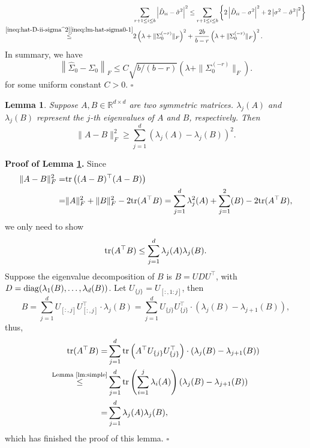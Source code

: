 \documentclass[11pt]{article}
\newtheorem{Lemma}{Lemma}
\newcommand{\0}{{\mathbf{0}}}
\newcommand{\1}{{\mathbf{1}}}
\newcommand{\tr}{{\rm tr}}
\newcommand{\diag}{{\rm diag}}
\begin{document}
\begin{equation*}
\begin{split}
& \sum_{r+1\leq i \leq b}\left|\hat{D}_{ii} - \hat{\sigma}^2\right|^2 \leq \sum_{r+1\leq i \leq b} \left\{2\left|\hat{D}_{ii} - \sigma^2\right|^2 + 2\left|\sigma^2 - \hat{\sigma}^2\right|^2\right\}\\
\overset{\eqref{ineq:hat-D-ii-sigma^2}\eqref{ineq:lm-hat-sigma0-1}}{\leq} & 2\left(\lambda+ \|\Sigma_0^{(-r)}\|_F\right)^2 + \frac{2b}{b-r}\left(\lambda + \|\Sigma_0^{(-r)}\|_F\right)^2.
\end{split}
\end{equation*}
In summary, we have
$$\left\|\hat{\Sigma}_0 - \Sigma_0\right\|_F \leq C\sqrt{b/(b-r)}\left(\lambda+\|\Sigma_0^{(-r)}\|_F\right).$$
for some uniform constant $C>0$.
\quad $\square$

\begin{Lemma}\label{lm:A-B}
	Suppose $A, B\in \mathbb{R}^{d\times d}$ are two symmetric matrices. $\lambda_j(A)$ and $\lambda_j(B)$ represent the $j$-th eigenvalues of $A$ and $B$, respectively. Then
	\begin{equation}
	\|A - B\|_F^2 \geq \sum_{j=1}^d \left(\lambda_j(A) - \lambda_j(B)\right)^2.
	\end{equation}
\end{Lemma}

{\bf\noindent Proof of Lemma \ref{lm:A-B}.} Since 
\begin{equation*}
\begin{split}
\|A-B\|_F^2 = & \tr\left((A-B)^\top(A-B)\right) \\
= & \|A\|_F^2 + \|B\|_F^2 - 2\tr(A^\top B) = \sum_{j=1}^d \lambda_j^2(A) + \sum_{j=1}^2(B) - 2\tr(A^\top B),
\end{split}
\end{equation*}
we only need to show
\begin{equation}\label{ineq:to-show-1}
\tr(A^\top B) \leq \sum_{j=1}^d \lambda_j(A) \lambda_j(B).
\end{equation}
Suppose the eigenvalue decomposition of $B$ is $B = UDU^\top$, with $D = \diag(\lambda_1(B), \ldots, \lambda_d(B))$. Let $U_{\{j\}} = U_{[:, 1:j]}$, then
\begin{equation*}
B = \sum_{j=1}^d U_{[:, j]}U_{[:, j]}^\top \cdot \lambda_j(B) = \sum_{j=1}^d U_{\{j\}}U_{\{j\}}^\top \cdot \left(\lambda_j(B) - \lambda_{j+1}(B)\right),
\end{equation*}
thus,
\begin{equation*}
\begin{split}
\tr(A^\top B) = & \sum_{j=1}^d \tr\left(A^\top U_{\{j\}}U_{\{j\}}^\top\right) \cdot \left(\lambda_j(B) - \lambda_{j+1}(B)\right)\\
\overset{\text{Lemma \ref{lm:simple}}}{\leq} & \sum_{j=1}^d \tr\left(\sum_{i=1}^j \lambda_i(A)\right) \left(\lambda_j(B) - \lambda_{j+1}(B)\right)\\
= & \sum_{j=1}^d \lambda_j(A)\lambda_j(B),
\end{split}
\end{equation*}
which has finished the proof of this lemma.
\quad $\square$
\end{document}
